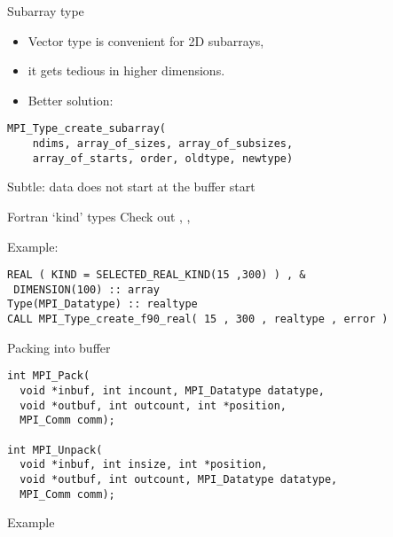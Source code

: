 \begin{numberedframe}{Subarray type}
  \begin{itemize}
  \item Vector type is convenient for 2D subarrays,
  \item it gets tedious in higher dimensions.
  \item Better solution: 
  \end{itemize}
\begin{lstlisting}
MPI_Type_create_subarray(
    ndims, array_of_sizes, array_of_subsizes,
    array_of_starts, order, oldtype, newtype)  
\end{lstlisting}
Subtle: data does not start at the buffer start
\end{numberedframe}

\begin{exerciseframe}[cubegather]
  
\end{exerciseframe}

\begin{numberedframe}{Fortran `kind' types}
  Check out
,
,

Example:
\lstset{language=Fortran}
\begin{lstlisting}
REAL ( KIND = SELECTED_REAL_KIND(15 ,300) ) , &
 DIMENSION(100) :: array
Type(MPI_Datatype) :: realtype
CALL MPI_Type_create_f90_real( 15 , 300 , realtype , error )
\end{lstlisting}
\end{numberedframe}


\begin{numberedframe}{Packing into buffer}
\lstset{language=C}
\begin{lstlisting}
int MPI_Pack(
  void *inbuf, int incount, MPI_Datatype datatype,
  void *outbuf, int outcount, int *position,
  MPI_Comm comm);

int MPI_Unpack(
  void *inbuf, int insize, int *position,
  void *outbuf, int outcount, MPI_Datatype datatype,
  MPI_Comm comm);
\end{lstlisting}
\end{numberedframe}

\begin{numberedframe}{Example}
\small
{}
\end{numberedframe}

